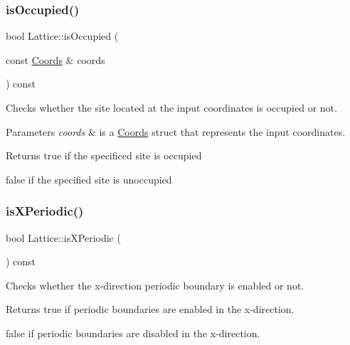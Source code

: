 \subsubsection{\texorpdfstring{is\+Occupied()}{isOccupied()}}
{\footnotesize\ttfamily bool Lattice\+::is\+Occupied (\begin{DoxyParamCaption}\item[{const \hyperlink{struct_coords}{Coords} \&}]{coords }\end{DoxyParamCaption}) const}



Checks whether the site located at the input coordinates is occupied or not. 


\begin{DoxyParams}{Parameters}
{\em coords} & is a \hyperlink{struct_coords}{Coords} struct that represents the input coordinates. \\
\hline
\end{DoxyParams}
\begin{DoxyReturn}{Returns}
true if the specificed site is occupied 

false if the specified site is unoccupied 
\end{DoxyReturn}
\mbox{\label{class_lattice_accf3b995e0d0cb422907728a29b1b523}} 
\subsubsection{\texorpdfstring{is\+X\+Periodic()}{isXPeriodic()}}
{\footnotesize\ttfamily bool Lattice\+::is\+X\+Periodic (\begin{DoxyParamCaption}{ }\end{DoxyParamCaption}) const}



Checks whether the x-\/direction periodic boundary is enabled or not. 

\begin{DoxyReturn}{Returns}
true if periodic boundaries are enabled in the x-\/direction. 

false if periodic boundaries are disabled in the x-\/direction. 
\end{DoxyReturn}
\mbox{\label{class_lattice_ac3192acefb019c5258143a6c758b3e48}} 
